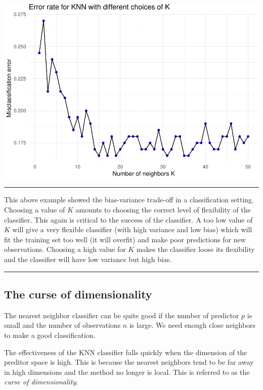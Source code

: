 \documentclass[]{article}
\begin{document}
\includegraphics{2StatLearn_files/figure-latex/knnerror-1.pdf}

\begin{center}\rule{0.5\linewidth}{\linethickness}\end{center}

This above example showed the bias-variance trade-off in a
classification setting. Choosing a value of \(K\) amounts to choosing
the correct level of flexibility of the classifier. This again is
critical to the success of the classifier. A too low value of \(K\) will
give a very flexible classifier (with high variance and low bias) which
will fit the training set too well (it will overfit) and make poor
predictions for new observations. Choosing a high value for \(K\) makes
the classifier loose its flexibility and the classifier will have low
variance but high bias.

\begin{center}\rule{0.5\linewidth}{\linethickness}\end{center}

\hypertarget{the-curse-of-dimensionality}{%
\subsection{The curse of
dimensionality}\label{the-curse-of-dimensionality}}

The nearest neighbor classifier can be quite good if the number of
predictor \(p\) is small and the number of observations \(n\) is large.
We need enough close neighbors to make a good classification.

The effectiveness of the KNN classifier falls quickly when the dimension
of the preditor space is high. This is because the nearest neighbors
tend to be far away in high dimensions and the method no longer is
local. This is referred to as the \emph{curse of dimensionality}.
\end{document}

